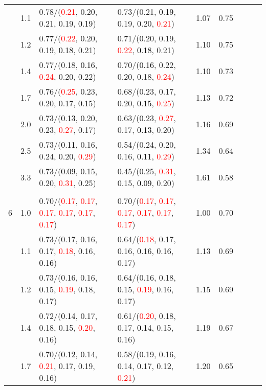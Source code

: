 \documentclass[10pt,a4paper]{report}
\begin{document}
\begin{table}[!htbp]
\begin{center}
{\begin{tabular}{ccllccccc}
			&1.1&0.78/(\textcolor{red}{0.21}, 0.20, 0.21, 0.19, \textcolor{black}{0.19})&0.73/(0.21, \textcolor{black}{0.19}, 0.19, 0.20, \textcolor{red}{0.21})&1.07&0.75\\
			&1.2&0.77/(\textcolor{red}{0.22}, 0.20, 0.19, \textcolor{black}{0.18}, 0.21)&0.71/(0.20, 0.19, \textcolor{red}{0.22}, \textcolor{black}{0.18}, 0.21)&1.10&0.75\\
			&1.4&0.77/(0.18, \textcolor{black}{0.16}, \textcolor{red}{0.24}, 0.20, 0.22)&0.70/(\textcolor{black}{0.16}, 0.22, 0.20, 0.18, \textcolor{red}{0.24})&1.10&0.73\\
			&1.7&0.76/(\textcolor{red}{0.25}, 0.23, 0.20, 0.17, \textcolor{black}{0.15})&0.68/(0.23, 0.17, 0.20, \textcolor{black}{0.15}, \textcolor{red}{0.25})&1.13&0.72\\
			&2.0&0.73/(\textcolor{black}{0.13}, 0.20, 0.23, \textcolor{red}{0.27}, 0.17)&0.63/(0.23, \textcolor{red}{0.27}, 0.17, \textcolor{black}{0.13}, 0.20)&1.16&0.69\\
			&2.5&0.73/(\textcolor{black}{0.11}, 0.16, 0.24, 0.20, \textcolor{red}{0.29})&0.54/(0.24, 0.20, 0.16, \textcolor{black}{0.11}, \textcolor{red}{0.29})&1.34&0.64\\
			&3.3&0.73/(\textcolor{black}{0.09}, 0.15, 0.20, \textcolor{red}{0.31}, 0.25)&0.45/(0.25, \textcolor{red}{0.31}, 0.15, \textcolor{black}{0.09}, 0.20)&1.61&0.58\\
			&&&&\\
			6			&1.0&0.70/(\textcolor{red}{0.17}, \textcolor{red}{0.17}, \textcolor{red}{0.17}, \textcolor{red}{0.17}, \textcolor{red}{0.17}, \textcolor{red}{0.17})&0.70/(\textcolor{red}{0.17}, \textcolor{red}{0.17}, \textcolor{red}{0.17}, \textcolor{red}{0.17}, \textcolor{red}{0.17}, \textcolor{red}{0.17})&1.00&0.70\\
			&1.1&0.73/(0.17, 0.16, 0.17, \textcolor{red}{0.18}, 0.16, \textcolor{black}{0.16})&0.64/(\textcolor{red}{0.18}, 0.17, 0.16, 0.16, \textcolor{black}{0.16}, 0.17)&1.13&0.69\\
			&1.2&0.73/(0.16, 0.16, \textcolor{black}{0.15}, \textcolor{red}{0.19}, 0.18, 0.17)&0.64/(0.16, 0.18, \textcolor{black}{0.15}, \textcolor{red}{0.19}, 0.16, 0.17)&1.15&0.69\\
			&1.4&0.72/(\textcolor{black}{0.14}, 0.17, 0.18, 0.15, \textcolor{red}{0.20}, 0.16)&0.61/(\textcolor{red}{0.20}, 0.18, 0.17, \textcolor{black}{0.14}, 0.15, 0.16)&1.19&0.67\\
			&1.7&0.70/(\textcolor{black}{0.12}, 0.14, \textcolor{red}{0.21}, 0.17, 0.19, 0.16)&0.58/(0.19, 0.16, 0.14, 0.17, \textcolor{black}{0.12}, \textcolor{red}{0.21})&1.20&0.65\\

\end{tabular}}
\end{center}
\end{table}
\end{document}
